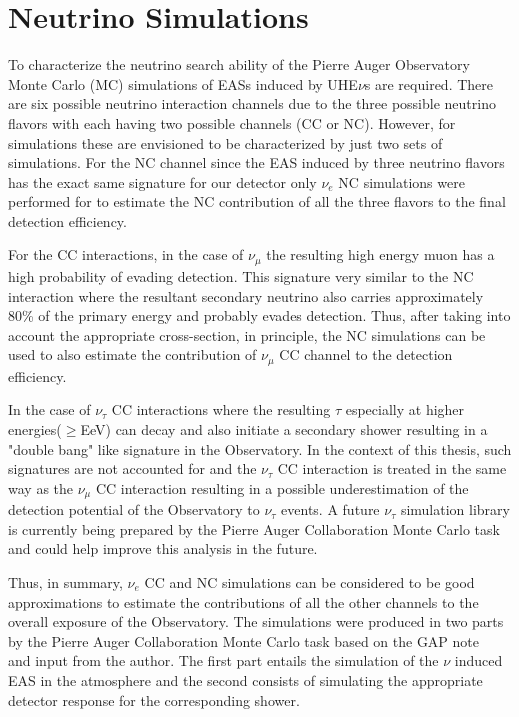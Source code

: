 \section{Neutrino Simulations}
\label{sec:sim_DGL}
To characterize the neutrino search ability of the Pierre Auger Observatory Monte Carlo (MC) simulations of EASs induced by UHE$\nu$s are required. There are six possible neutrino interaction channels due to the three possible neutrino flavors with each having two possible channels (CC or NC). However, for simulations these are envisioned to be characterized by just two sets of simulations. For the NC channel since the EAS induced by three neutrino flavors has the exact same signature for our detector only $\nu_e$ NC simulations were performed for to estimate the NC contribution of all the three flavors to the final detection efficiency. 

For the CC interactions, in the case of $\nu_{\mu}$ the resulting high energy muon has a high probability of evading detection. This signature very similar to the NC interaction where the resultant secondary neutrino also carries approximately 80\% of the primary energy and probably evades detection. Thus, after taking into account the appropriate cross-section, in principle, the NC simulations can be used to also estimate the contribution of $\nu_{\mu}$ CC channel to the detection efficiency.  

In the case of $\nu_{\tau}$ CC interactions where the resulting $\tau$ especially at higher energies($\geq $EeV) can decay and also initiate a secondary shower resulting in a "double bang" like signature in the Observatory. In the context of this thesis, such signatures are not accounted for and the $\nu_{\tau}$ CC interaction is treated in the same way as the $\nu_{\mu}$ CC interaction resulting in a possible underestimation of the detection potential of the Observatory to $\nu_{\tau}$ events. A future $\nu_{\tau}$ simulation library is currently being prepared by the Pierre Auger Collaboration Monte Carlo task and could help improve this analysis in the future.

Thus, in summary, $\nu_e$ CC and NC simulations can be considered to be good approximations to estimate the contributions of all the other channels to the overall exposure of the Observatory. The simulations were produced in two parts by the Pierre Auger Collaboration Monte Carlo task based on the GAP note~\cite{gap_note_2013} and input from the author. The first part entails the simulation of the $\nu$ induced EAS in the atmosphere and the second consists of simulating the appropriate detector response for the corresponding shower. 

